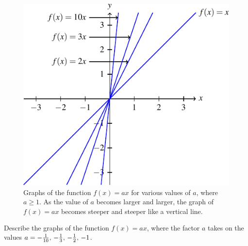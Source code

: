 \documentclass[a4paper,oneside,12pt]{article}
\begin{document}
\begin{figure}[!htbp]
\centering
\includegraphics[scale=1]{image/06/ax-large.pdf}
\caption{%
  Graphs of the function $f(x) = ax$ for various values of $a$, where
  $a \geq 1$.  As the value of $a$ becomes larger and larger, the
  graph of $f(x) = ax$ becomes steeper and steeper like a vertical
  line.
}
\label{fig:function_ax_positive_at_least_one}
\end{figure}

\begin{exercise}
Describe the graphs of the function $f(x) = ax$, where the factor $a$
takes on the values
$a = {-\frac{1}{10}},\, {-\frac{1}{3}},\, {-\frac{1}{2}},\, {-1}$.
\end{exercise}
\end{document}
